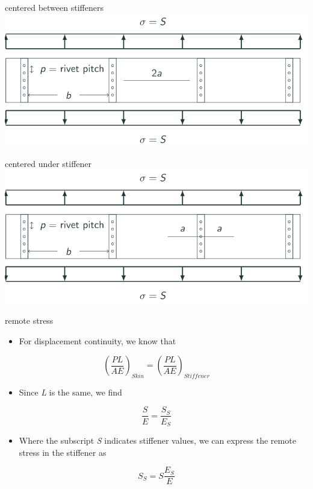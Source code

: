 \documentclass[
  letterpaper,
  ignorenonframetext,
  aspectratio=43,
  handout,
  12pt]{beamer}
\providecommand{\tightlist}{%
  \setlength{\itemsep}{0pt}\setlength{\parskip}{0pt}}
\providecommand{\tightlist}{%
\setlength{\itemsep}{0pt}\setlength{\parskip}{0pt}}
\let\Oldincludegraphics\includegraphics
\renewcommand{\includegraphics}[2][]{\Oldincludegraphics[width=\textwidth,height=0.7\textheight,keepaspectratio]{#2}}
\begin{document}
\begin{frame}{centered between stiffeners}
\protect\hypertarget{centered-between-stiffeners}{}
\includegraphics{../images/crack-under.svg}
\end{frame}

\begin{frame}{centered under stiffener}
\protect\hypertarget{centered-under-stiffener}{}
\includegraphics{../images/crack-between.svg}
\end{frame}

\begin{frame}{remote stress}
\protect\hypertarget{remote-stress}{}
\begin{itemize}
\tightlist
\item
  For displacement continuity, we know that
\end{itemize}

\[\left(\frac{PL}{AE}\right)_{Skin} = \left(\frac{PL}{AE}\right)_{Stiffener}\]

\begin{itemize}
\tightlist
\item
  Since \emph{L} is the same, we find
\end{itemize}

\[\frac{S}{E} = \frac{S_S}{E_S}\]

\begin{itemize}
\tightlist
\item
  Where the subscript \emph{S} indicates stiffener values, we can
  express the remote stress in the stiffener as
\end{itemize}

\[S_S = S \frac{E_S}{E}\]
\end{frame}
\end{document}
